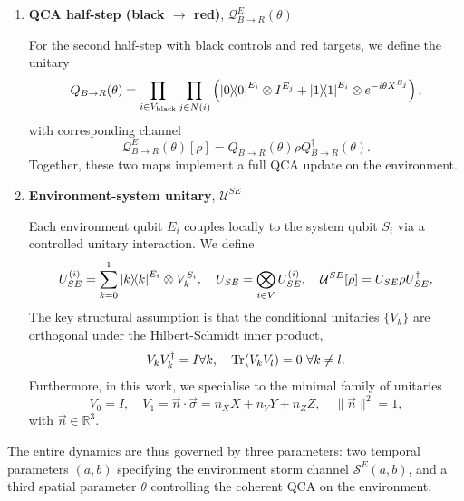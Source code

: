 \begin{enumerate}
    \item \textbf{QCA half-step (black \(\to\) red)}, \(\mathcal{Q}_{B\to R}^E(\theta)\)
    
    For the second half-step with black controls and red targets, we define the unitary
    \begin{equation}
        Q_{B\to R}(\theta) = \prod_{i\in V_\mathrm{black}} \prod_{j\in N(i)}
        \left(
            \ket{0}\!\!\bra{0}^{E_i} \otimes I^{E_j} + \ket{1}\!\!\bra{1}^{E_i} \otimes e^{-i\theta X^{E_j}}
        \right),
    \end{equation}
    with corresponding channel
    \begin{equation}
        \mathcal{Q}_{B\to R}^E(\theta)[\rho] = Q_{B\to R}(\theta) \rho Q_{B\to R}^\dagger(\theta).
    \end{equation}
    Together, these two maps implement a full QCA update on the environment.

    \item \textbf{Environment-system unitary}, \(\mathcal{U}^{SE}\)
    
    Each environment qubit \(E_i\) couples locally to the system qubit \(S_i\) via a controlled unitary interaction. We define
    \begin{equation}\label{eq:qca-se-unitary}
        U_{SE}^{(i)} = \sum_{k=0}^1 \ket{k}\!\!\bra{k}^{E_i} \otimes V_k^{S_i}, 
        \quad U_{SE} = \bigotimes_{i \in V} U_{SE}^{(i)},
        \quad \mathcal{U}^{SE}[\rho] = U_{SE} \rho U_{SE}^\dagger,
    \end{equation}
    The key structural assumption is that the conditional unitaries \(\{V_k\}\) are orthogonal under the Hilbert-Schmidt inner product, 
    \begin{equation}\label{eq:se-unitary-condition}
        V_k V_k^\dagger = I \forall k, \quad \mathrm{Tr}(V_k V_l) = 0 \ \forall k \ne l.
    \end{equation}
    Furthermore, in this work, we specialise to the minimal family of unitaries
    \begin{equation}\label{eq:qca-system-unitary}
        V_0 = I, \quad V_1 = \vec{n} \cdot \vec{\sigma} = n_X X + n_Y Y + n_Z Z, \quad \|\vec{n}\|^2 = 1,
    \end{equation}
    with \(\vec{n} \in \mathbb{R}^3\).
\end{enumerate}
The entire dynamics are thus governed by three parameters: two temporal parameters \((a, b)\) specifying the environment storm channel \(\mathcal{S}^E (a, b)\), and a third spatial parameter \(\theta\) controlling the coherent QCA on the environment.

